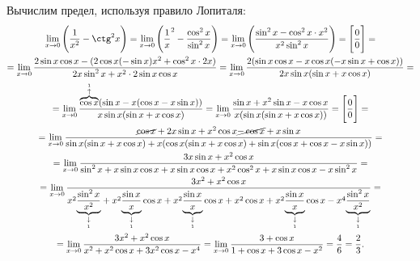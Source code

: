 \documentclass{article}
\begin{document}
\clearpage
Вычислим предел, используя правило Лопиталя:
\begin{multline*}
\lim\limits_{x \to 0}\Bigg(\dfrac{1}{x^2}-\ctg^2 x\Bigg) = \lim\limits_{x \to 0}\Bigg(\dfrac 1 x^2 - \dfrac{\cos^2 x}{\sin^2 x}\Bigg) = \lim\limits_{x \to 0}\Bigg(\dfrac{\sin^2 x - \cos^2 x \cdot x^2}{x^2\sin^2 x}\Bigg) = \Bigg[\dfrac 0 0\Bigg] =\\
= \lim\limits_{x \to 0}\dfrac{2\sin x \cos x - (2\cos x(-\sin x)x^2 + \cos^2 x \cdot 2x)}{2x\sin^2 x + x^2 \cdot 2 \sin x \cos x}
= \lim\limits_{x \to 0}\dfrac{2(\sin x \cos x - x \cos x(-x\sin x + \cos x))}{2x\sin x(\sin x + x \cos x)} =\\
= \lim\limits_{x \to 0}\dfrac{\overset{\overset 1 \uparrow}{\overbrace{\cos x}}(\sin x - x(\cos x - x\sin x))}{x\sin x(\sin x + x \cos x)} = \lim\limits_{x \to 0}\dfrac{\sin x + x^2\sin x - x\cos x}{x(\sin x(\sin x + x \cos x))} = \Bigg[\dfrac 0 0\Bigg] =\\
= \lim\limits_{x \to 0}\dfrac{\cancel{\cos x} + 2x\sin x + x^2 \cos x \cancel{- \cos x} + x \sin x}{\sin x(\sin x + x \cos x) + x(\cos x(\sin x + x \cos x) + \sin x(\cos x + \cos x - x\sin x))} = \\
= \lim\limits_{x \to 0}\dfrac{3x\sin x + x^2 \cos x}{\sin^2 x + x \sin x \cos x + x \sin x \cos x + x^2 \cos^2 x + x \sin x \cos x - x \sin^2 x} =\\
= \lim\limits_{x \to 0}\dfrac{3x^2 + x^2\cos x}
{x^2 \underset{\underset 1 \downarrow}{\underbrace{\dfrac{\sin^2 x}{x^2}}}
+ x^2 \underset{\underset 1 \downarrow}{\underbrace{\dfrac{\sin x}{x}}} \cos x
+ x^2 \underset{\underset 1 \downarrow}{\underbrace{\dfrac{\sin x}{x}}} \cos x
+ x^2 \cos x + x^2 \underset{\underset 1 \downarrow}{\underbrace{\dfrac{\sin x}{x}}} \cos x
- x^4 \underset{\underset 1 \downarrow}{\underbrace{\dfrac{\sin^2 x}{x^2}}}} =\\
= \lim\limits_{x \to 0}\dfrac{3x^2 + x^2\cos x}{x^2 + x^2\cos x + 3x^2\cos x - x^4} = \lim\limits_{x \to 0}\dfrac{3+\cos x}{1 + \cos x + 3 \cos x - x^2} = \dfrac 4 6 = \dfrac 2 3.
\end{multline*}
\end{document}
